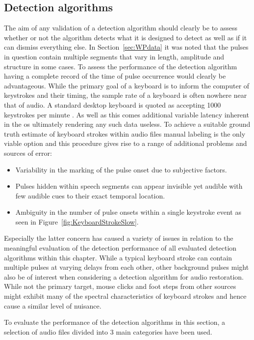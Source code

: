 \subsection{Detection algorithms}
The aim of any validation of a detection algorithm should clearly be to assess whether or not the algorithm detects what it is designed to detect as well as if it can dismiss everything else. In Section~\ref{sec:WPdata} it was noted that the pulses in question contain multiple segments that vary in length, amplitude and structure in some cases. To assess the performance of the detection algorithm having a complete record of the time of pulse occurrence would clearly be advantageous. While the primary goal of a keyboard is to inform the computer of keystrokes and their timing, the sample rate of a keyboard is often nowhere near that of audio. A standard desktop keyboard is quoted as accepting 1000 keystrokes per minute \cite{MSCurveKeyboard3000}. As well as this comes additional variable latency inherent in the \gls{os} ultimately rendering any such data useless. To achieve a suitable ground truth estimate of keyboard strokes within audio files manual labeling is the only viable option and this procedure gives rise to a range of additional problems and sources of error:

\begin{itemize}
  \item Variability in the marking of the pulse onset due to subjective factors.
  \item Pulses hidden within speech segments can appear invisible yet audible with few audible cues to their exact temporal location.
  \item Ambiguity in the number of pulse onsets within a single keystroke event as seen in Figure~\ref{fig:KeyboardStrokeSlow}.
\end{itemize}

Especially the latter concern has caused a variety of issues in relation to the meaningful evaluation of the detection performance of all evaluated detection algorithms within this chapter. While a typical keyboard stroke can contain multiple pulses at varying delays from each other, other background pulses might also be of interest when considering a detection algorithm for audio restoration. While not the primary target, mouse clicks and foot steps from other sources might exhibit many of the spectral characteristics of keyboard strokes and hence cause a similar level of nuisance.

To evaluate the performance of the detection algorithms in this section, a selection of audio files divided into 3 main categories have been used.

